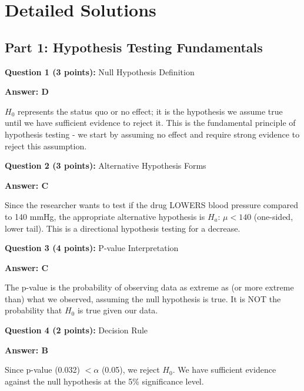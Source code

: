 \documentclass[11pt]{article}
\begin{document}
\newpage

\section*{Detailed Solutions}

\subsection*{Part 1: Hypothesis Testing Fundamentals}

\textbf{Question 1 (3 points):} Null Hypothesis Definition

\textcolor{correctgreen}{\textbf{Answer: D}}

$H_0$ represents the status quo or no effect; it is the hypothesis we assume true until we have sufficient evidence to reject it. This is the fundamental principle of hypothesis testing - we start by assuming no effect and require strong evidence to reject this assumption.

\vspace{0.5cm}

\textbf{Question 2 (3 points):} Alternative Hypothesis Forms

\textcolor{correctgreen}{\textbf{Answer: C}}

Since the researcher wants to test if the drug LOWERS blood pressure compared to 140 mmHg, the appropriate alternative hypothesis is $H_a$: $\mu < 140$ (one-sided, lower tail). This is a directional hypothesis testing for a decrease.

\vspace{0.5cm}

\textbf{Question 3 (4 points):} P-value Interpretation

\textcolor{correctgreen}{\textbf{Answer: C}}

The p-value is the probability of observing data as extreme as (or more extreme than) what we observed, assuming the null hypothesis is true. It is NOT the probability that $H_0$ is true given our data.

\vspace{0.5cm}

\textbf{Question 4 (2 points):} Decision Rule

\textcolor{correctgreen}{\textbf{Answer: B}}

Since p-value (0.032) $< \alpha$ (0.05), we reject $H_0$. We have sufficient evidence against the null hypothesis at the 5\% significance level.

\vspace{0.5cm}
\end{document}
